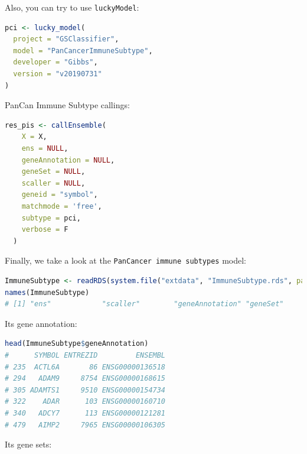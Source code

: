 \documentclass[
  12pt,
]{book}
\newcommand{\passthrough}[1]{#1}
\begin{document}
Also, you can try to use \passthrough{\lstinline!luckyModel!}:

\begin{lstlisting}[language=R]
pci <- lucky_model(
  project = "GSClassifier",
  model = "PanCancerImmuneSubtype",
  developer = "Gibbs",
  version = "v20190731"
)
\end{lstlisting}

PanCan Immune Subtype callings:

\begin{lstlisting}[language=R]
res_pis <- callEnsemble(
    X = X,
    ens = NULL,
    geneAnnotation = NULL,
    geneSet = NULL,
    scaller = NULL,
    geneid = "symbol",
    matchmode = 'free',
    subtype = pci,
    verbose = F
  )
\end{lstlisting}

Finally, we take a look at the \passthrough{\lstinline!PanCancer immune subtypes!} model:

\begin{lstlisting}[language=R]
ImmuneSubtype <- readRDS(system.file("extdata", "ImmuneSubtype.rds", package = "GSClassifier"))
names(ImmuneSubtype)
# [1] "ens"            "scaller"        "geneAnnotation" "geneSet"
\end{lstlisting}

Its gene annotation:

\begin{lstlisting}[language=R]
head(ImmuneSubtype$geneAnnotation)
#      SYMBOL ENTREZID         ENSEMBL
# 235  ACTL6A       86 ENSG00000136518
# 294   ADAM9     8754 ENSG00000168615
# 305 ADAMTS1     9510 ENSG00000154734
# 322    ADAR      103 ENSG00000160710
# 340   ADCY7      113 ENSG00000121281
# 479   AIMP2     7965 ENSG00000106305
\end{lstlisting}

Its gene sets:
\end{document}
